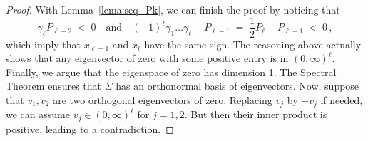 \documentclass[10pt,a4paper]{amsart}
\begin{document}
\begin{proof}
With Lemma~\ref{lema:seq_Pk}, we can finish the proof by noticing that
\begin{equation*}
\gamma_\ell P_{\ell-2} \;<\;0
\quad \text{and} \quad
(-1)^{\ell}\gamma_1\dots\gamma_\ell - P_{\ell-1}
\;=\; \frac{1}{2}P_{\ell} - P_{\ell-1} \;<\; 0\,,
\end{equation*}
which imply that $x_{\ell-1}$ and $x_{\ell}$ have the same sign. The reasoning
above actually shows that any eigenvector of zero with some positive entry is in $(0,\infty)^\ell$. Finally, we argue that the eigenspace of zero
has dimension 1. The Spectral Theorem ensures that $\Sigma$ has
an orthonormal basis of eigenvectors. Now, suppose that $v_1, v_2$ are two
orthogonal eigenvectors of zero. Replacing $v_j$ by $-v_j$ if needed, we can
assume $v_j \in (0, \infty)^\ell$ for $j=1,2$. But then their inner product is
positive, leading to a contradiction.
\end{proof}
\end{document}
